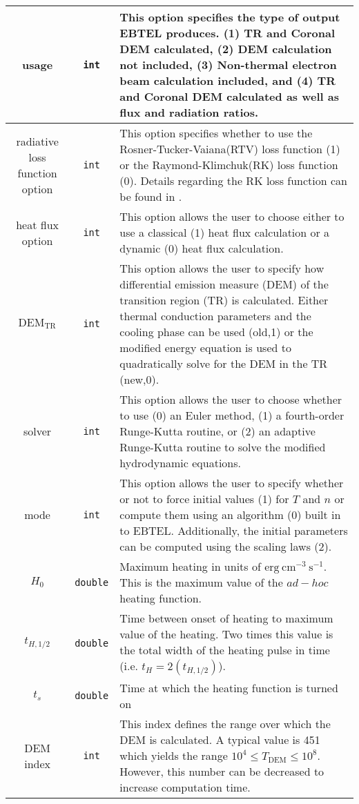 \documentclass[preprint,10pt]{aastex}
\begin{document}
\begin{appendix}
\begin{table}[]
\begin{center}
\begin{tabular}{c  c || p{10cm}}
	 usage & \texttt{int} & This option specifies the type of output EBTEL produces. (1) TR and Coronal DEM calculated, (2) DEM calculation not included, 
	 				 (3) Non-thermal electron beam calculation included, and (4) TR and Coronal DEM calculated as well as flux and radiation ratios.\\ \hline
	radiative loss function option & \texttt{int} & This option specifies whether to use the Rosner-Tucker-Vaiana(RTV) loss function (1) or the Raymond-Klimchuk(RK) loss function (0). Details regarding the  RK loss function can be found in \citet{klimchuk_highly_2008}. \\ \hline
	heat flux option & \texttt{int} & This option allows the user to choose either to use a classical (1) heat flux calculation or a dynamic (0) heat flux calculation. \\ \hline
	$\text{DEM}_{\text{TR}}$ & \texttt{int} & This option allows the user to specify how differential emission measure (DEM) of the transition region (TR) is calculated. Either thermal conduction parameters and the cooling phase can be used (old,1) or the modified energy equation is used to quadratically solve for the DEM in the TR (new,0). \\ \hline
	solver & \texttt{int} & This option allows the user to choose whether to use (0) an Euler method, (1) a fourth-order Runge-Kutta routine, or (2) an adaptive Runge-Kutta routine to solve the modified hydrodynamic equations. \\ \hline
	mode & \texttt{int} & This option allows the user to specify whether or not to force initial values (1) for $T$ and $n$ or compute them using an algorithm (0) built in to EBTEL. Additionally, the initial parameters can be computed using the scaling laws (2).\\ \hline
	$H_0$ & \texttt{double} & Maximum heating in units of $\text{erg}~\text{cm}^{-3}~\text{s}^{-1}$. This is the maximum value of the $ad-hoc$ heating function. \\ \hline
	$t_{H,1/2}$ & \texttt{double} & Time between onset of heating to maximum value of the heating. Two times this value is the total width of the heating pulse in time (i.e. $t_H = 2(t_{H,1/2})$). \\ \hline
	$t_s$	&	\texttt{double}	&	Time at which the heating function is turned on \\ \hline
	DEM index	&	\texttt{int}	&	This index defines the range over which the DEM is calculated. A typical value is 451 which yields the range $10^4\le T_{\text{DEM}}\le10^8$. However, this number can be decreased to increase computation time. \\ \hline

\end{tabular}
\end{center}
\end{table}
\end{appendix}
\end{document}
